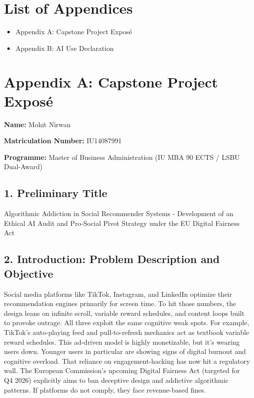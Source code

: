 \documentclass[11pt]{article}
\begin{document}
\newpage
\printbibliography

\newpage
\section*{List of Appendices}
\begin{itemize}
\item Appendix A: Capstone Project Exposé
\item Appendix B: AI Use Declaration
\end{itemize}

\newpage
\section{Appendix A: Capstone Project Expos\'e}
\label{sec:appendix_a_expose}

\textbf{Name:} Mohit Nirwan

\textbf{Matriculation Number:} IU14087991

\textbf{Programme:} Master of Business Administration (IU MBA 90 ECTS / LSBU Dual-Award)

\subsection*{1. Preliminary Title}
Algorithmic Addiction in Social Recommender Systems - Development of an Ethical AI Audit and Pro-Social Pivot Strategy under the EU Digital Fairness Act

\subsection*{2. Introduction: Problem Description and Objective}
Social media platforms like TikTok, Instagram, and LinkedIn optimize their recommendation engines primarily for screen time. To hit those numbers, the design leans on infinite scroll, variable reward schedules, and content loops built to provoke outrage. All three exploit the same cognitive weak spots. For example, TikTok's auto-playing feed and pull-to-refresh mechanics act as textbook variable reward schedules. This ad-driven model is highly monetizable, but it's wearing users down. Younger users in particular are showing signs of digital burnout and cognitive overload. That reliance on engagement-hacking has now hit a regulatory wall. The European Commission's upcoming Digital Fairness Act (targeted for Q4 2026) explicitly aims to ban deceptive design and addictive algorithmic patterns. If platforms do not comply, they face revenue-based fines.
\end{document}
